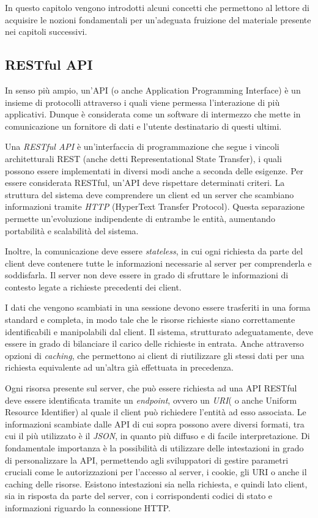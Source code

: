 In questo capitolo vengono introdotti alcuni concetti che permettono al lettore di acquisire le nozioni fondamentali per un'adeguata fruizione del materiale presente nei capitoli successivi.


\subsection{RESTful API}
In senso più ampio, un'API (o anche Application Programming Interface) è un insieme di protocolli attraverso i quali viene permessa l'interazione di più  applicativi.
Dunque è considerata come un software di intermezzo  che mette in comunicazione  un fornitore di dati e l'utente destinatario di questi ultimi.

Una \emph{RESTful API} \cite{RTF}  è un'interfaccia di programmazione che segue i vincoli architetturali REST (anche detti Representational State Transfer), i quali possono essere implementati in diversi modi anche a seconda delle esigenze.
Per essere considerata RESTful, un’API deve rispettare determinati criteri.
La struttura del sistema deve comprendere un client ed un server che scambiano informazioni tramite \textit{HTTP} (HyperText Transfer Protocol). Questa separazione permette un'evoluzione indipendente di entrambe le entità, aumentando portabilità e scalabilità del sistema.

Inoltre, la comunicazione deve essere \emph{stateless},  in cui ogni richiesta da parte del client deve contenere tutte le informazioni necessarie al server per comprenderla e soddisfarla. Il server non deve essere in grado di sfruttare le informazioni di contesto legate a richieste precedenti dei client.


I dati che vengono scambiati in una sessione devono essere trasferiti in una forma standard e completa, in modo tale che le risorse richieste siano correttamente identificabili e manipolabili dal client.
Il sistema, strutturato adeguatamente, deve essere in grado di bilanciare il carico delle richieste in entrata.
Anche attraverso opzioni di \textit{caching}, che permettono ai client di riutilizzare gli stessi dati per una richiesta equivalente ad un'altra già effettuata in precedenza.

Ogni risorsa presente sul server, che può essere richiesta ad una API RESTful deve essere identificata tramite un \emph{endpoint}, ovvero un \emph{URI}( o anche Uniform Resource Identifier) al quale il client può  richiedere l'entità ad esso associata.
Le informazioni scambiate dalle API di cui sopra possono avere diversi formati, tra cui il più utilizzato è il \emph{JSON}, in quanto più diffuso e di facile interpretazione.
Di fondamentale importanza è la possibilità di utilizzare delle intestazioni in grado di personalizzare la API, permettendo agli sviluppatori di gestire parametri cruciali come le autorizzazioni per l'accesso al server, i cookie, gli URI o anche il caching delle risorse. Esistono intestazioni sia nella richiesta, e quindi lato client, sia in risposta da parte del server, con i corrispondenti codici di stato e informazioni riguardo la connessione HTTP.





